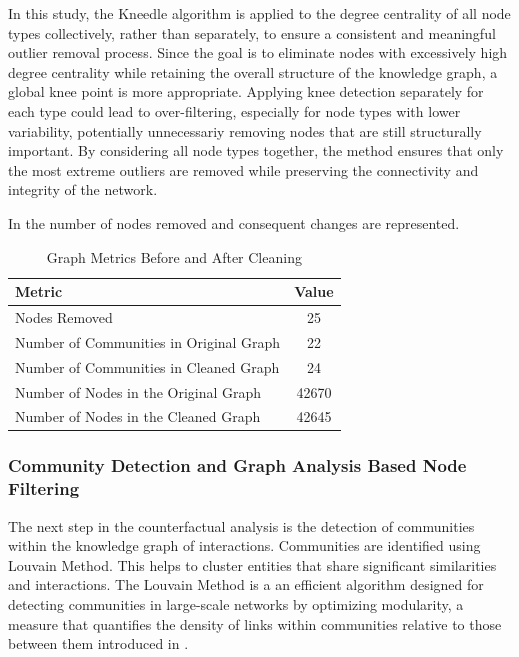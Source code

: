 In this study, the Kneedle algorithm is applied to the degree centrality of all node
types collectively, rather than separately, to ensure a consistent and meaningful
outlier removal process. Since the goal is to eliminate nodes with excessively
high degree centrality while retaining the overall structure of the knowledge
graph, a global knee point is more appropriate. Applying knee detection
separately for each type could lead to over-filtering, especially for node types
with lower variability, potentially unnecessariy removing nodes that are still
structurally important. By considering all node types together, the method
ensures that only the most extreme outliers are removed while preserving the
connectivity and integrity of the network.

In  the number of nodes removed and consequent changes
are represented.

\begin{table}[h]
	\centering
	\begin{tabular}{l c}
		\hline
		\textbf{Metric}                         & \textbf{Value} \\
		\hline
		Nodes Removed                           & 25             \\
		Number of Communities in Original Graph & 22             \\
		Number of Communities in Cleaned Graph  & 24             \\
		Number of Nodes in the Original Graph   & 42670          \\
		Number of Nodes in the Cleaned Graph    & 42645          \\
		\hline
	\end{tabular}
	\caption{Graph Metrics Before and After Cleaning}
	\label{tab:graph_metrics}
\end{table}

\subsubsection{Community Detection and Graph Analysis Based Node Filtering}
The next step in the counterfactual analysis is the detection of communities within
the knowledge graph of interactions. Communities are identified using Louvain
Method. This helps to cluster entities that share significant similarities and interactions.
The Louvain Method is a an efficient algorithm designed for detecting
communities in large-scale networks by optimizing modularity, a measure that quantifies
the density of links within communities relative to those between them introduced
in \parencite{blondel_fast_2008}.

